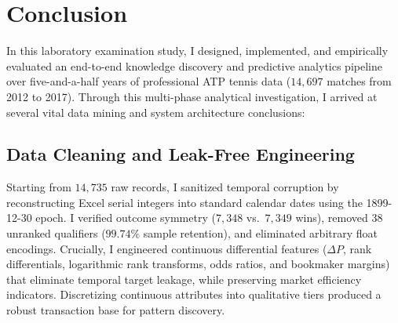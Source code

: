 \documentclass[10pt,journal]{IEEEtran}
\begin{document}
\section{Conclusion}
In this laboratory examination study, I designed, implemented, and empirically evaluated an end-to-end knowledge discovery and predictive analytics pipeline over five-and-a-half years of professional ATP tennis data ($14,697$ matches from 2012 to 2017). Through this multi-phase analytical investigation, I arrived at several vital data mining and system architecture conclusions:

\subsection{Data Cleaning and Leak-Free Engineering}
Starting from $14,735$ raw records, I sanitized temporal corruption by reconstructing Excel serial integers into standard calendar dates using the 1899-12-30 epoch. I verified outcome symmetry ($7,348$ vs.\ $7,349$ wins), removed $38$ unranked qualifiers ($99.74\%$ sample retention), and eliminated arbitrary float encodings. Crucially, I engineered continuous differential features ($\Delta P$, rank differentials, logarithmic rank transforms, odds ratios, and bookmaker margins) that eliminate temporal target leakage, while preserving market efficiency indicators. Discretizing continuous attributes into qualitative tiers produced a robust transaction base for pattern discovery.
\end{document}
